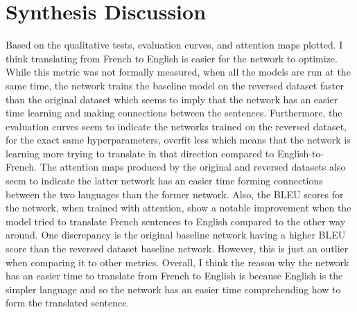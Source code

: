 \documentclass[a4paper]{article}
\begin{document}
\section*{\textbf{Synthesis Discussion}}
Based on the qualitative tests, evaluation curves, and attention maps plotted. I think translating from French to English is easier for the network to optimize. While this metric was not formally measured, when all the models are run at the same time, the network trains the baseline model on the reversed dataset faster than the original dataset which seems to imply that the network has an easier time learning and making connections between the sentences. Furthermore, the evaluation curves seem to indicate the networks trained on the reversed dataset, for the exact same hyperparameters, overfit less which means that the network is learning more trying to translate in that direction compared to English-to-French. The attention maps produced by the original and reversed datasets also seem to indicate the latter network has an easier time forming connections between the two languages than the former network. Also, the BLEU scores for the network, when trained with attention, show a notable improvement when the model tried to translate French sentences to English compared to the other way around. One discrepancy is the original baseline network having a higher BLEU score than the reversed dataset baseline network. However, this is just an outlier when comparing it to other metrics. Overall, I think the reason why the network has an easier time to translate from French to English is because English is the simpler language and so the network has an easier time comprehending how to form the translated sentence.
\end{document}
